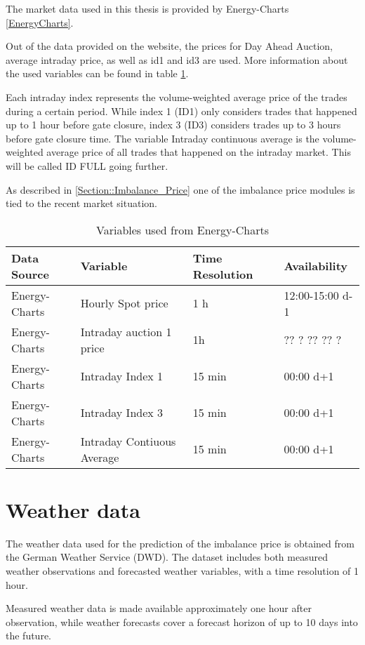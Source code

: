 \documentclass[class=scrbook, crop=false]{standalone}
\begin{document}
The market data used in this thesis is provided by Energy-Charts \ref{EnergyCharts}.


Out of the data provided on the website, the prices for Day Ahead Auction, average intraday price, as well as id1 and id3 are used. 
More information about the used variables can be found in table \ref{Table::Market_Data}.

Each intraday index represents the volume-weighted average price of the trades during a certain period. 
While index 1 (ID1) only considers trades that happened up to 1 hour before gate closure, index 3 (ID3) considers trades up to 3 hours before gate closure time.
The variable Intraday continuous average is the volume-weighted average price of all trades that happened on the intraday market. 
This will be called ID FULL going further.

As described in \ref{Section::Imbalance_Price} one of the imbalance price modules is tied to the recent market situation.	

    
\begin{table}[]
\begin{tabular}{l|l|l|l}
 Data Source & Variable &  Time Resolution & Availability  \\\hline
 Energy-Charts & Hourly Spot price& 1 h& 12:00-15:00 d-1 \\
 Energy-Charts & Intraday auction 1 price & 1h & ?? ? ?? ?? ?\\
 Energy-Charts & Intraday Index 1 & 15 min &  00:00 d+1\\
 Energy-Charts & Intraday Index 3 & 15 min &  00:00 d+1\\
 Energy-Charts & Intraday Contiuous Average & 15 min &  00:00 d+1\\
   
\end{tabular}
\caption{Variables used from Energy-Charts}
\label{Table::Market_Data}
\end{table}

\section{Weather data}
\label{Section::Weather_Data}

The weather data used for the prediction of the imbalance price is obtained from the German Weather Service (DWD).
The dataset includes both measured weather observations and forecasted weather variables, with a time resolution of  1 hour.

Measured weather data is made available approximately one hour after observation, while weather forecasts cover a forecast horizon of up to 10 days into the future.
\end{document}
